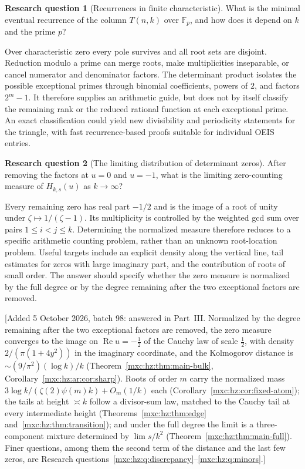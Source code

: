 \documentclass[11pt]{article}
\numberwithin{equation}{section}
\theoremstyle{definition}
\newtheorem{question}{Research question}
\theoremstyle{remark}
\begin{document}
\begin{question}[Recurrences in finite characteristic]
What is the minimal eventual recurrence of the column $T(n,k)$ over
$\mathbb F_p$, and how does it depend on $k$ and the prime $p$?
\end{question}

Over characteristic zero every pole survives and all root sets are
disjoint. Reduction modulo a prime can merge roots, make multiplicities
inseparable, or cancel numerator and denominator factors. The determinant
product isolates the possible exceptional primes through binomial
coefficients, powers of $2$, and factors $2^m-1$. It therefore supplies
an arithmetic guide, but does not by itself classify the remaining
rank or the reduced rational function at each exceptional prime.
An exact classification could yield new divisibility and periodicity
statements for the triangle, with fast recurrence-based proofs suitable
for individual OEIS entries.

\begin{question}[The limiting distribution of determinant zeros]
After removing the factors at $u=0$ and $u=-1$, what is the limiting
zero-counting measure of $H_{k,s}(u)$ as $k\to\infty$?
\end{question}

Every remaining zero has real part $-1/2$ and is the image of a root
of unity under $\zeta\mapsto1/(\zeta-1)$. Its multiplicity is controlled
by the weighted gcd sum over pairs $1\le i<j\le k$. Determining the
normalized measure therefore reduces to a specific arithmetic counting
problem, rather than an unknown root-location problem. Useful targets
include an explicit density along the vertical line, tail estimates
for zeros with large imaginary part, and the contribution of roots
of small order. The answer should specify whether the zero measure is
normalized by the full degree or by the degree remaining after the
two exceptional factors are removed.

[Added 5 October 2026, batch 98: answered in Part~III. Normalized by the
degree remaining after the two exceptional factors are removed, the zero
measure converges to the image on $\operatorname{Re}u=-\frac12$ of the
Cauchy law of scale $\frac12$, with density $2/(\pi(1+4y^2))$ in the
imaginary coordinate, and the Kolmogorov distance is
$\sim(9/\pi^2)(\log k)/k$ (Theorem~\ref{mxc:hz:thm:main-bulk},
Corollary~\ref{mxc:hz:ar:cor:sharp}). Roots of order $m$ carry the
normalized mass $3\log k/(\zeta(2)\psi(m)k)+O_m(1/k)$ each
(Corollary~\ref{mxc:hz:cor:fixed-atom}); the tails at height $\asymp k$
follow a divisor-sum law, matched to the Cauchy tail at every intermediate
height (Theorems~\ref{mxc:hz:thm:edge} and~\ref{mxc:hz:thm:transition});
and under the full degree the limit is a three-component mixture determined
by $\lim s/k^2$ (Theorem~\ref{mxc:hz:thm:main-full}). Finer questions,
among them the second term of the distance and the last few zeros, are
Research questions~\ref{mxc:hz:q:discrepancy}--\ref{mxc:hz:q:minors}.]
\end{document}
